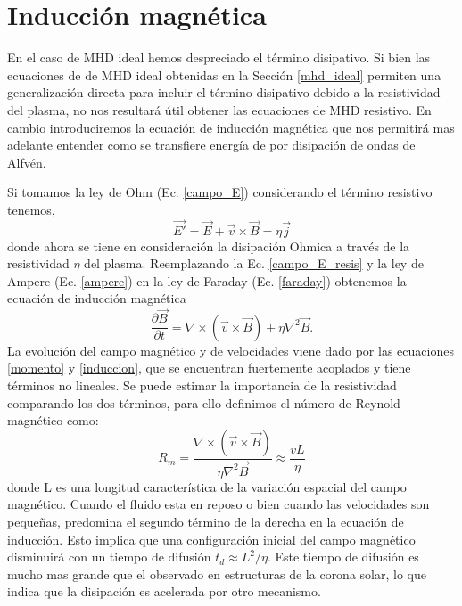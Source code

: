 \documentclass[a4paper,11pt]{report}
\begin{document}
\section{Inducción magnética}
En el caso de MHD ideal hemos despreciado el término disipativo. Si bien las ecuaciones de de MHD ideal obtenidas en la Sección \ref{mhd_ideal} permiten una generalización directa para incluir el término disipativo debido a la resistividad del plasma, no nos resultará útil obtener las ecuaciones de MHD resistivo. En cambio introduciremos la ecuación de inducción magnética que nos permitirá mas adelante entender como se transfiere energía de por disipación de ondas de Alfvén.

Si tomamos la ley de Ohm (Ec. \ref{campo_E}) considerando el término resistivo tenemos,
\begin{equation}
\vec{E'} = \vec{E} + \vec{v} \times \vec{B} = \eta \vec{j} \label{campo_E_resis}
\end{equation}
donde ahora se tiene en consideración la disipación Ohmica a través de la resistividad $\eta$ del plasma.
Reemplazando la Ec. \ref{campo_E_resis} y la ley de Ampere (Ec. \ref{ampere}) en la ley de Faraday (Ec. \ref{faraday}) obtenemos la ecuación de inducción magnética
\begin{equation}
\frac{\partial \vec{B}}{\partial t} = \nabla \times (\vec{v} \times \vec{B}) + \eta \nabla^2 \vec{B}. \label{induccion}
\end{equation}
La evolución del campo magnético y de velocidades viene dado por las ecuaciones \ref{momento} y \ref{induccion}, que se encuentran fuertemente acoplados y tiene términos no lineales.
Se puede estimar la importancia de la resistividad comparando los dos términos, para ello definimos el número de Reynold magnético como:
\begin{equation}
R_m = \frac{\nabla \times (\vec{v} \times \vec{B}) }{\eta \nabla^2 \vec{B}} \approx \frac{vL}{\eta}\label{reynold}
\end{equation}
 donde L es una longitud característica de la variación espacial del campo magnético. Cuando el fluido esta en reposo o bien cuando las velocidades son pequeñas, predomina el segundo término de la derecha en la ecuación de inducción. Esto implica que una configuración inicial del campo magnético disminuirá con un tiempo de difusión $t_d\approx L^2/\eta$. Este tiempo de difusión es mucho mas grande que el observado en estructuras de la corona solar, lo que indica que la disipación es acelerada por otro mecanismo.
 
\end{document}
